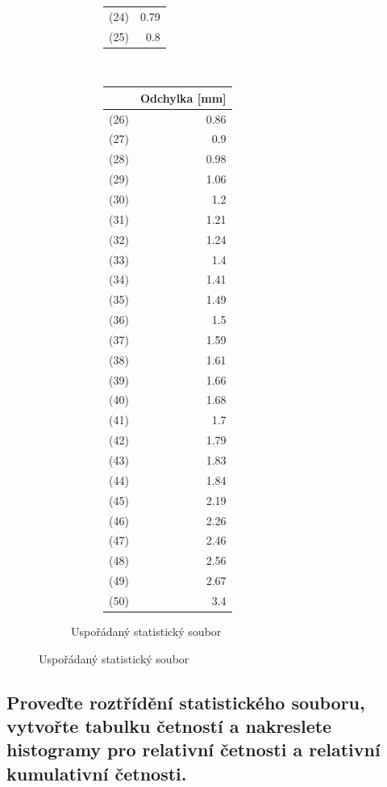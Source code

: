 \documentclass[11pt,titlepage]{article}
\begin{document}
\begin{figure}[htbp]
\begin{subfigure}[t]{0.5\textwidth}
\begin{subfigure}[t]{0.5\textwidth}
\begin{center}
\begin{tabular}{lr}
(24) & 0.79\\
(25) & 0.8\\
\end{tabular}
\end{center}
\end{subfigure}~\begin{subfigure}[t]{0.5\textwidth}
\begin{center}
\begin{tabular}{lr}
 & Odchylka [mm]\\
\hline
(26) & 0.86\\
(27) & 0.9\\
(28) & 0.98\\
(29) & 1.06\\
(30) & 1.2\\
(31) & 1.21\\
(32) & 1.24\\
(33) & 1.4\\
(34) & 1.41\\
(35) & 1.49\\
(36) & 1.5\\
(37) & 1.59\\
(38) & 1.61\\
(39) & 1.66\\
(40) & 1.68\\
(41) & 1.7\\
(42) & 1.79\\
(43) & 1.83\\
(44) & 1.84\\
(45) & 2.19\\
(46) & 2.26\\
(47) & 2.46\\
(48) & 2.56\\
(49) & 2.67\\
(50) & 3.4\\
\end{tabular}
\end{center}
\end{subfigure}\caption{Uspořádaný statistický soubor}\end{subfigure}\end{figure}

\subsection{Proveďte roztřídění statistického souboru, vytvořte tabulku četností a nakreslete histogramy pro relativní četnosti a relativní kumulativní četnosti.}
\label{sec:orga08d732}
\end{document}
